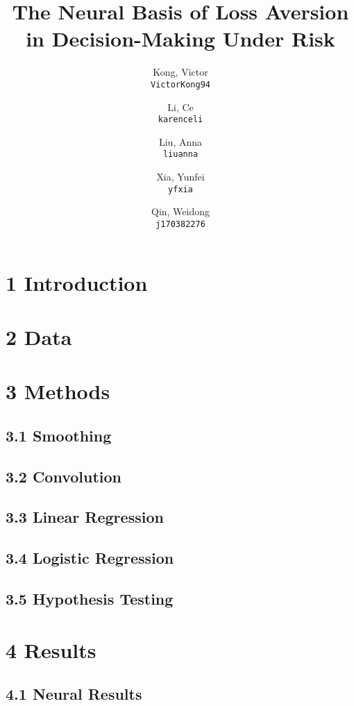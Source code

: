 \documentclass[11pt]{article}
\title{The Neural Basis of Loss Aversion in Decision-Making Under Risk}
\author{
  Kong, Victor\\
  \texttt{VictorKong94}
  \and
  Li, Ce\\
  \texttt{karenceli}
  \and
  Liu, Anna\\
  \texttt{liuanna}
  \and
  Xia, Yunfei\\
  \texttt{yfxia}
  \and
  Qin, Weidong\\
  \texttt{j170382276}
}
\begin{document}
\maketitle

\abstract{}

\section{1 Introduction}
        

\section{2 Data}
        

\section{3 Methods}

    \subsection{3.1 Smoothing}
            
    \subsection{3.2 Convolution}
            
    \subsection{3.3 Linear Regression}
            
    \subsection{3.4 Logistic Regression}
                
    \subsection{3.5 Hypothesis Testing}
                

\section{4 Results}

    \subsection{4.1 Neural Results}
            
\end{document}
